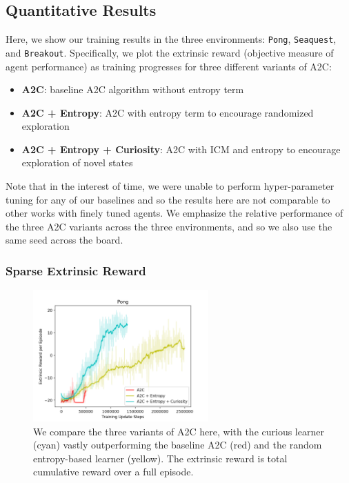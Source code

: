 \documentclass{article}
\begin{document}
\subsection{Quantitative Results}
Here, we show our training results in the three environments: \texttt{Pong}, \texttt{Seaquest}, and \texttt{Breakout}. Specifically, we plot the extrinsic reward (objective measure of agent performance) as training progresses for three different variants of A2C:
\begin{small}
\begin{itemize}
  \item \textbf{A2C}: baseline A2C algorithm without entropy term
  \item \textbf{A2C + Entropy}: A2C with entropy term to encourage randomized exploration
  \item \textbf{A2C + Entropy + Curiosity}: A2C with ICM and entropy to encourage exploration of novel states
\end{itemize}
\end{small}
Note that in the interest of time, we were unable to perform hyper-parameter tuning for any of our baselines and so the results here are not comparable to other works with finely tuned agents. We emphasize the relative performance of the three A2C variants across the three environments, and so we also use the same seed across the board.

\subsubsection{Sparse Extrinsic Reward}
\begin{figure}
  \centering
  \includegraphics[width=0.6\textwidth]{figures/pong_rewards}
  \caption{We compare the three variants of A2C here, with the curious learner (cyan) vastly outperforming the baseline A2C (red) and the random entropy-based learner (yellow). The extrinsic reward is total cumulative reward over a full episode.}
  \label{fig:pong-reward}
\end{figure}
\end{document}
